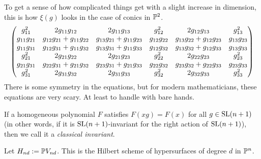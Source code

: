 \documentclass[11pt, english]{article}
\begin{document}
\begin{example}[Conics in the plane, $d=2$, $n=3$]
To get a sense of how complicated things get with a slight increase in dimension, this is how $\xi(g)$ looks in the case of conics in $\mathbb{P}^2$.
\[
\bgroup\begin{pmatrix}{g}_{11}^{2}&
      2 {g}_{11} {g}_{12}&
      2 {g}_{11} {g}_{13}&
      {g}_{12}^{2}&
      2 {g}_{12} {g}_{13}&
      {g}_{13}^{2}\\
      {g}_{11} {g}_{21}&
      {g}_{12} {g}_{21}+{g}_{11} {g}_{22}&
      {g}_{13} {g}_{21}+{g}_{11} {g}_{23}&
      {g}_{12} {g}_{22}&
      {g}_{13} {g}_{22}+{g}_{12} {g}_{23}&
      {g}_{13} {g}_{23}\\
      {g}_{11} {g}_{31}&
      {g}_{12} {g}_{31}+{g}_{11} {g}_{32}&
      {g}_{13} {g}_{31}+{g}_{11} {g}_{33}&
      {g}_{12} {g}_{32}&
      {g}_{13} {g}_{32}+{g}_{12} {g}_{33}&
      {g}_{13} {g}_{33}\\
      {g}_{21}^{2}&
      2 {g}_{21} {g}_{22}&
      2 {g}_{21} {g}_{23}&
      {g}_{22}^{2}&
      2 {g}_{22} {g}_{23}&
      {g}_{23}^{2}\\
      {g}_{21} {g}_{31}&
      {g}_{22} {g}_{31}+{g}_{21} {g}_{32}&
      {g}_{23} {g}_{31}+{g}_{21} {g}_{33}&
      {g}_{22} {g}_{32}&
      {g}_{23} {g}_{32}+{g}_{22} {g}_{33}&
      {g}_{23} {g}_{33}\\
      {g}_{31}^{2}&
      2 {g}_{31} {g}_{32}&
      2 {g}_{31} {g}_{33}&
      {g}_{32}^{2}&
      2 {g}_{32} {g}_{33}&
      {g}_{33}^{2}\\
      \end{pmatrix}\egroup
\]
There is some symmetry in the equations, but for modern mathematicians, these equations are very scary. At least to handle with bare hands.
\end{example}

\begin{defi}
 If a homogeneous polynomial $F$ satisfies $F(xg)=F(x)$ for all $g \in \operatorname{SL}(n+1)$ (in other words, if it is $\operatorname{SL}(n+1)$-invariant for the right action of $\operatorname{SL}(n+1)$), then we call it a \emph{classical invariant}.
\end{defi}

Let $H_{nd} := \mathbb{P} V_{nd}$. This is the Hilbert scheme of hypersurfaces of degree $d$ in $\mathbb{P}^n$.
\end{document}
